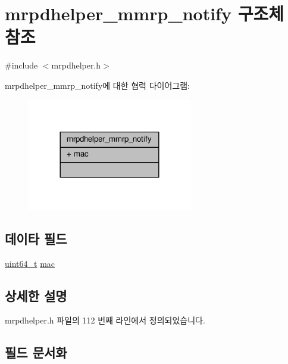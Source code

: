 \hypertarget{structmrpdhelper__mmrp__notify}{}\section{mrpdhelper\+\_\+mmrp\+\_\+notify 구조체 참조}
\label{structmrpdhelper__mmrp__notify}


{\ttfamily \#include $<$mrpdhelper.\+h$>$}



mrpdhelper\+\_\+mmrp\+\_\+notify에 대한 협력 다이어그램\+:
\nopagebreak
\begin{figure}[H]
\begin{center}
\leavevmode
\includegraphics[width=204pt]{structmrpdhelper__mmrp__notify__coll__graph}
\end{center}
\end{figure}
\subsection*{데이타 필드}
\begin{DoxyCompactItemize}
\item 
\hyperlink{parse_8c_aec6fcb673ff035718c238c8c9d544c47}{uint64\+\_\+t} \hyperlink{structmrpdhelper__mmrp__notify_a920661745231ffa48515d83a8953e76f}{mac}
\end{DoxyCompactItemize}


\subsection{상세한 설명}


mrpdhelper.\+h 파일의 112 번째 라인에서 정의되었습니다.



\subsection{필드 문서화}
